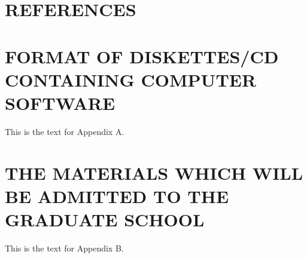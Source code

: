 \documentclass{iztechthesis}
\begin{document}


\maketitle 
\setcounter{page}{2}
\makeapprovalpage


\tableofcontents
\listoffigures
\listoftables
\clearpage








\clearpage
{}
\chapter*{REFERENCES} 
\nocite{*} 
\printbibliography[heading=none] 

\appendix
\chapter{FORMAT OF DISKETTES/CD CONTAINING COMPUTER SOFTWARE}
This is the text for Appendix A. 

\chapter{THE MATERIALS WHICH WILL BE ADMITTED TO THE GRADUATE SCHOOL}
This is the text for Appendix B. 
\end{document}
